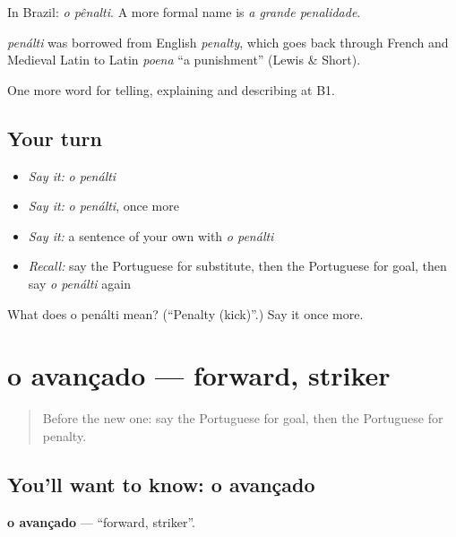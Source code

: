 In Brazil: \emph{o pênalti}. A more formal name is \emph{a grande penalidade}.

\begin{cousinweb}
\emph{penálti} was borrowed from English \emph{penalty}, which goes back through French and Medieval Latin to Latin \emph{poena} \textquotedblleft{}a punishment\textquotedblright{} (Lewis \& Short).
\end{cousinweb}

\begin{grammarlens}[title={What you've built}]
One more word for telling, explaining and describing at B1.
\end{grammarlens}

\subsection*{Your turn}
\begin{itemize}
\raggedright
  \item \emph{Say it:} \emph{o penálti}
  \item \emph{Say it:} \emph{o penálti}, once more
  \item \emph{Say it:} a sentence of your own with \emph{o penálti}
  \item \emph{Recall:} say the Portuguese for substitute, then the Portuguese for goal, then say \emph{o penálti} again
\end{itemize}

\begin{tcolorbox}[breakable,colback=teal!4,colframe=teal!35!black,title={Before you move on}]
What does o penálti mean? (\textquotedblleft{}Penalty (kick)\textquotedblright{}.) Say it once more.
\end{tcolorbox}
\section[o avançado]{o avançado — forward, striker}

\label{lesson:PT-C509-avancado}



\begin{quote}
Before the new one: say the Portuguese for goal, then the Portuguese for penalty.
\end{quote}

\subsection*{You'll want to know: o avançado}
\textbf{o avançado} — \textquotedblleft{}forward, striker\textquotedblright{}.

